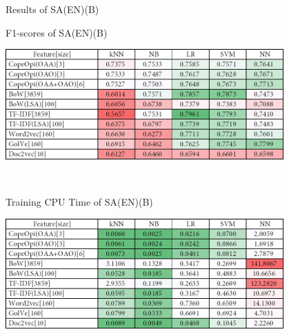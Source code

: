 \caption{Results of SA(EN)(B)}
\label{tab:sa_en_b}
\centering
\begin{subtable}{\textwidth}
	\centering
	\caption{F1-scores of SA(EN)(B)}
	\includegraphics[width=0.8\textwidth]{./figure/01A2.png}
\end{subtable}\\[1em]
\begin{subtable}{\textwidth}
	\centering
	\caption{Training CPU Time of SA(EN)(B)}
	\includegraphics[width=0.8\textwidth]{./figure/01A2t.png}
\end{subtable}
